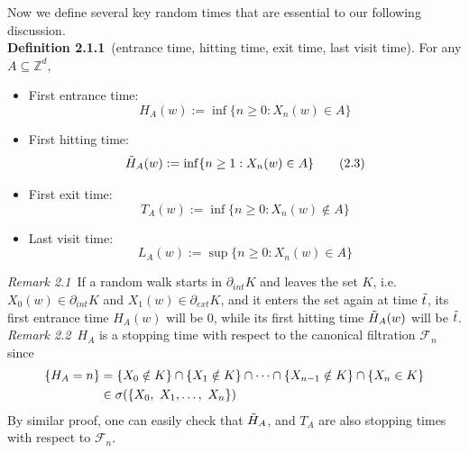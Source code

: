 \documentclass[
11pt, %
a4paper, %
oneside, %
headinclude,footinclude, %
BCOR5mm, %
]{scrartcl}
\begin{document}
Now we define several key random times that are essential to our following discussion.
\vspace{0.6em}\\\textbf{Definition 2.1.1}\ (entrance time, hitting time, exit time, last visit time). For any $A \subseteq \mathbb{Z}^d$,
\begin{itemize}
    \item First entrance time:
    \begin{equation}
    \label{eq2.2}
    H_A(w):= \inf \{n \geq 0:X_n(w) \in A\}\tag{2.2} 
    \end{equation}
    \item First hitting time:
    \begin{equation}
    \Tilde{H}_A(w):=\inf\{n \geq 1:X_n(w) \in A\}\tag{2.3}
    \end{equation}
    \item First exit time:
    \begin{equation}
    T_A(w):=\inf\{n \geq 0:X_n(w) \notin A \}\tag{2.4}
    \end{equation}
    \item Last visit time:
    \begin{equation}
    L_A(w):=\sup\{ n \geq 0:X_n(w) \in A \}\tag{2.5}
    \end{equation}   
\end{itemize}
\textit{Remark 2.1}\ If a random walk starts in $\partial_{int}K$ and leaves the set $K$, i.e. $X_0(w) \in \partial_{int}K$ and $X_1(w) \in \partial_{ext}K$, and it enters the set again at time $\Tilde{t}$, its first entrance time $H_A(w)$ will be $0$, while its first hitting time $\Tilde{H}_A(w)$ will be $\Tilde{t}$. 
\vspace{0.6em}\\\textit{Remark 2.2}\ $H_A$ is a stopping time with respect to the canonical filtration $\mathscr{F}_n$ since 
\begin{equation}
    \label{eqstoppingtime}
    \begin{aligned}
    \{H_A=n\}&=\{X_0 \notin K\} \cap \{X_1\notin K\} \cap \dots \cap \{X_{n-1}\notin K\} \cap \{X_n\in K\}\\
    &\in \sigma(\{X_0, \ X_1, \dots , \ X_n\})
    \end{aligned}\notag
\end{equation}
By similar proof, one can easily check that $\Tilde{H}_A$, and $T_A$ are also stopping times with respect to $\mathscr{F}_n$. 
\end{document}
